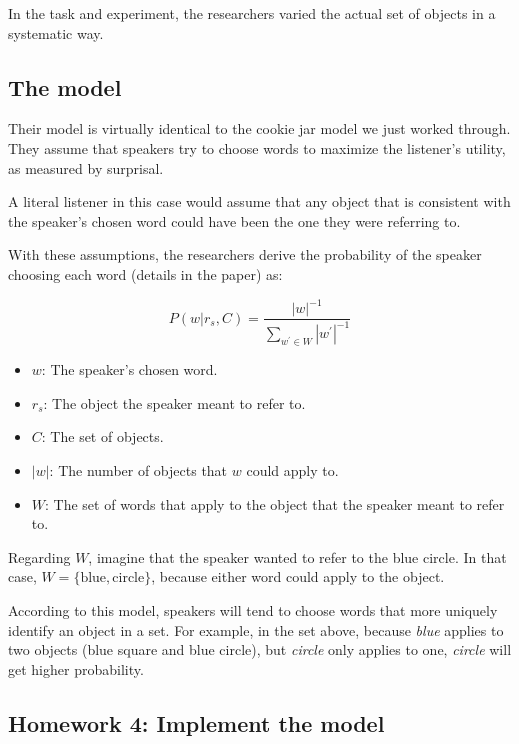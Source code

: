 \documentclass[
  letterpaper,
  DIV=11,
  numbers=noendperiod]{scrreprt}
\makeatletter
\newcommand*\pandocbounded[1]{%
  \sbox\pandoc@box{#1}%
  \Gscale@div\@tempa{\textheight}{\dimexpr\ht\pandoc@box+\dp\pandoc@box\relax}%
  \Gscale@div\@tempb{\linewidth}{\wd\pandoc@box}%
  \ifdim\@tempb\p@<\@tempa\p@\let\@tempa\@tempb\fi%
  \ifdim\@tempa\p@<\p@\scalebox{\@tempa}{\usebox\pandoc@box}%
  \else\usebox{\pandoc@box}%
  \fi%
}
\providecommand{\tightlist}{%
  \setlength{\itemsep}{0pt}\setlength{\parskip}{0pt}}
\makeatother
\begin{document}
In the task and experiment, the researchers varied the actual set of
objects in a systematic way.

\subsection{The model}\label{the-model-1}

Their model is virtually identical to the cookie jar model we just
worked through. They assume that speakers try to choose words to
maximize the listener's utility, as measured by surprisal.

A literal listener in this case would assume that any object that is
consistent with the speaker's chosen word could have been the one they
were referring to.

With these assumptions, the researchers derive the probability of the
speaker choosing each word (details in the paper) as:

\[
P(w|r_s,C) = \frac{|w|^{-1}}{\sum_{w^\prime \in W} {|w^\prime|}^{-1}}
\]

\begin{itemize}
\tightlist
\item
  \(w\): The speaker's chosen word.
\item
  \(r_s\): The object the speaker meant to refer to.
\item
  \(C\): The set of objects.
\item
  \(|w|\): The number of objects that \(w\) could apply to.
\item
  \(W\): The set of words that apply to the object that the speaker
  meant to refer to.
\end{itemize}

Regarding \(W\), imagine that the speaker wanted to refer to the blue
circle. In that case, \(W = \{ \text{blue}, \text{circle} \}\), because
either word could apply to the object.

According to this model, speakers will tend to choose words that more
uniquely identify an object in a set. For example, in the set above,
because \emph{blue} applies to two objects (blue square and blue
circle), but \emph{circle} only applies to one, \emph{circle} will get
higher probability.

\subsection{Homework 4: Implement the
model}\label{homework-4-implement-the-model}

\href{https://colab.research.google.com/drive/1qrSDiXLG4VlBJI_XajdbAFQdcwMAqD0W?usp=sharing}{\pandocbounded{}}
\end{document}
